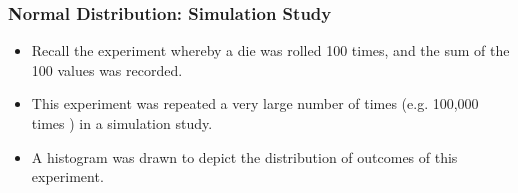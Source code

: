 \documentclass[a4]{beamer}
\begin{document}


%


\begin{frame}

\frametitle{Normal Distribution: Simulation Study}
\begin{itemize}
\item
Recall the experiment whereby a die was rolled 100 times, and the sum of the 100 values was recorded.\smallskip
\item
This experiment was repeated a very large number of times (e.g. 100,000 times ) in a simulation study.\smallskip
\item
A histogram was drawn to depict the distribution of outcomes of this experiment.


\end{itemize}
\end{frame}
\end{document}
